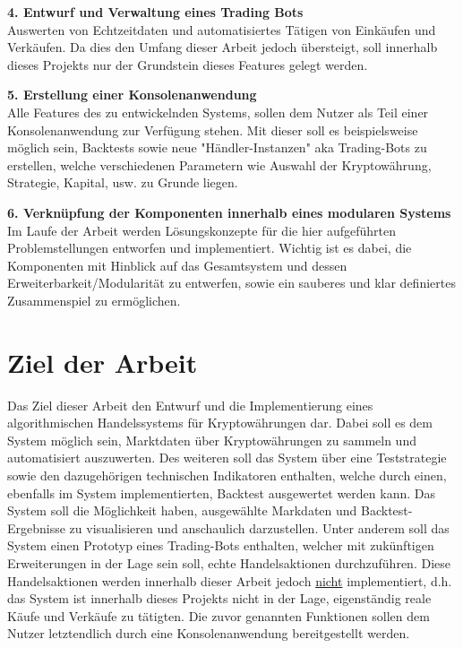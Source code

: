 \documentclass[oneside]{ausarbeitung}
\begin{document}
\textbf{4. Entwurf und Verwaltung eines Trading Bots} \\
Auswerten von Echtzeitdaten und automatisiertes Tätigen von
Einkäufen und Verkäufen. Da dies den Umfang dieser Arbeit jedoch
übersteigt, soll innerhalb dieses Projekts nur der Grundstein dieses
Features gelegt werden.

\textbf{5. Erstellung einer Konsolenanwendung} \\
Alle Features des zu entwickelnden Systems, sollen dem Nutzer als Teil
einer Konsolenanwendung zur Verfügung stehen. Mit dieser soll es
beispielsweise möglich sein, Backtests sowie neue
"Händler-Instanzen" aka Trading-Bots zu erstellen, welche
verschiedenen Parametern wie Auswahl der Kryptowährung, Strategie,
Kapital, usw. zu Grunde liegen.

\textbf{6. Verknüpfung der Komponenten innerhalb eines modularen Systems} \\
Im Laufe der Arbeit werden Lösungskonzepte für die hier
aufgeführten Problemstellungen entworfen und implementiert. Wichtig
ist es dabei, die Komponenten mit Hinblick auf das Gesamtsystem und
dessen Erweiterbarkeit/Modularität zu entwerfen, sowie ein sauberes
und klar definiertes Zusammenspiel zu ermöglichen. 

\section{Ziel der Arbeit}
\label{sec:ziel}

Das Ziel dieser Arbeit den Entwurf und die Implementierung
eines algorithmischen Handelssystems für Kryptowährungen dar. Dabei
soll es dem System möglich sein, Marktdaten über Kryptowährungen zu
sammeln und automatisiert auszuwerten. Des weiteren soll das System
über eine Teststrategie sowie den dazugehörigen technischen
Indikatoren enthalten, welche durch einen, ebenfalls im System
implementierten, Backtest ausgewertet werden kann. Das System soll die
Möglichkeit haben, ausgewählte Markdaten und Backtest-Ergebnisse
zu visualisieren und anschaulich darzustellen. Unter anderem soll das
System einen Prototyp eines Trading-Bots enthalten, welcher mit
zukünftigen Erweiterungen in der Lage sein soll, echte
Handelsaktionen durchzuführen. Diese Handelsaktionen werden innerhalb
dieser Arbeit jedoch \underline{nicht} implementiert, d.h. das System
ist innerhalb dieses Projekts nicht in der Lage, eigenständig reale
Käufe und Verkäufe zu tätigten. Die zuvor genannten Funktionen
sollen dem Nutzer letztendlich durch eine Konsolenanwendung
bereitgestellt werden.
\end{document}
